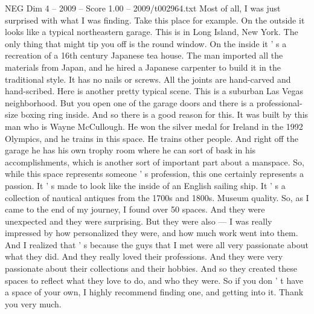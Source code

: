 \begin{textsample}{NEG Dim 4 – 2009 – Score 1.00 – 2009/t002964.txt}
Most of all, I was just surprised with what I was finding.
Take this place for example.
On the outside it looks like a typical northeastern garage.
This is in Long Island, New York.
The only thing that might tip you off is the round window.
On the inside it ' s a recreation of a 16th century Japanese tea house.
The man imported all the materials from Japan, and he hired a Japanese carpenter to build it in the traditional style.
It has no nails or screws.
All the joints are hand-carved and hand-scribed.
Here is another pretty typical scene.
This is a suburban Las Vegas neighborhood.
But you open one of the garage doors and there is a professional- size boxing ring inside.
And so there is a good reason for this.
It was built by this man who is Wayne McCullough.
He won the silver medal for Ireland in the 1992 Olympics, and he trains in this space.
He trains other people.
And right off the garage he has his own trophy room where he can sort of bask in his accomplishments, which is another sort of important part about a manspace.
So, while this space represents someone ' s profession, this one certainly represents a passion.
It ' s made to look like the inside of an English sailing ship.
It ' s a collection of nautical antiques from the 1700s and 1800s.
Museum quality.
So, as I came to the end of my journey, I found over 50 spaces.
And they were unexpected and they were surprising.
But they were also — I was really impressed by how personalized they were, and how much work went into them.
And I realized that ' s because the guys that I met were all very passionate about what they did.
And they really loved their professions.
And they were very passionate about their collections and their hobbies.
And so they created these spaces to reflect what they love to do, and who they were.
So if you don ' t have a space of your own, I highly recommend finding one, and getting into it.
Thank you very much.

\end{textsample}
